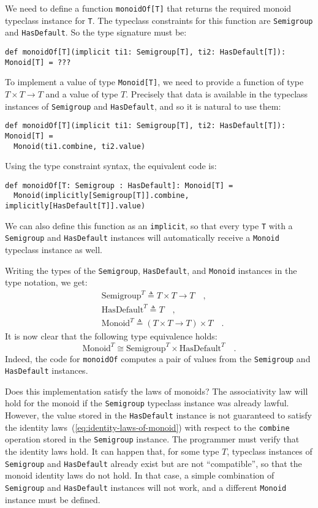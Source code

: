 We need to define a function \lstinline!monoidOf[T]! that returns
the required monoid typeclass instance for \lstinline!T!. The typeclass
constraints for this function are \lstinline!Semigroup! and \lstinline!HasDefault!.
So the type signature must be:
\begin{lstlisting}
def monoidOf[T](implicit ti1: Semigroup[T], ti2: HasDefault[T]): Monoid[T] = ???
\end{lstlisting}
To implement a value of type \lstinline!Monoid[T]!, we need to provide
a function of type $T\times T\rightarrow T$ and a value of type $T$.
Precisely that data is available in the typeclass instances of \lstinline!Semigroup!
and \lstinline!HasDefault!, and so it is natural to use them:
\begin{lstlisting}
def monoidOf[T](implicit ti1: Semigroup[T], ti2: HasDefault[T]): Monoid[T] =
  Monoid(ti1.combine, ti2.value)
\end{lstlisting}
Using the type constraint syntax, the equivalent code is:
\begin{lstlisting}
def monoidOf[T: Semigroup : HasDefault]: Monoid[T] =
  Monoid(implicitly[Semigroup[T]].combine, implicitly[HasDefault[T]].value)
\end{lstlisting}
We can also define this function as an \lstinline!implicit!, so that
every type \lstinline!T! with a \lstinline!Semigroup! and \lstinline!HasDefault!
instances will automatically receive a \lstinline!Monoid! typeclass
instance as well.

Writing the types of the \lstinline!Semigroup!, \lstinline!HasDefault!,
and \lstinline!Monoid! instances in the type notation, we get:
\begin{align*}
 & \text{Semigroup}^{T}\triangleq T\times T\rightarrow T\quad,\\
 & \text{HasDefault}^{T}\triangleq T\quad,\\
 & \text{Monoid}^{T}\triangleq\left(T\times T\rightarrow T\right)\times T\quad.
\end{align*}
It is now clear that the following type equivalence holds:
\[
\text{Monoid}^{T}\cong\text{Semigroup}^{T}\times\text{HasDefault}^{T}\quad.
\]
Indeed, the code for \lstinline!monoidOf! computes a pair of values
from the \lstinline!Semigroup! and \lstinline!HasDefault! instances. 

Does this implementation satisfy the laws of monoids? The associativity
law will hold for the monoid
if the \lstinline!Semigroup! typeclass instance was already lawful.
However, the value stored in the \lstinline!HasDefault! instance
is not guaranteed to satisfy the identity laws~(\ref{eq:identity-laws-of-monoid})
with respect to the \lstinline!combine! operation stored in the \lstinline!Semigroup!
instance. The programmer must verify that the identity laws hold.
It can happen that, for some type $T$, typeclass instances of \lstinline!Semigroup!
and \lstinline!HasDefault! already exist but are not \textsf{``}compatible\textsf{''},
so that the monoid identity laws do not hold. In that case, a simple
combination of \lstinline!Semigroup! and \lstinline!HasDefault!
instances will not work, and a different \lstinline!Monoid! instance
must be defined.

